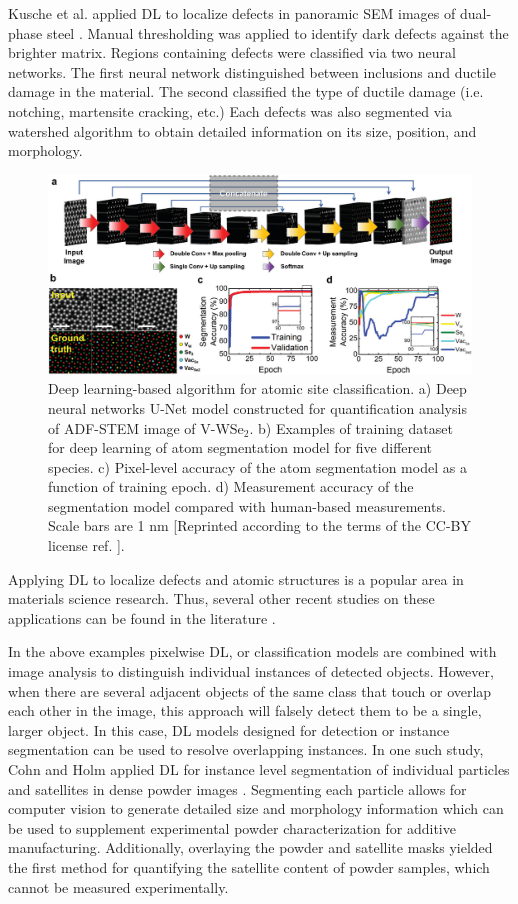 \documentclass[pdflatex,sn-mathphys]{sn-jnl}%
\theoremstyle{thmstyleone}%
\theoremstyle{thmstyletwo}%
\theoremstyle{thmstylethree}%
\begin{document}
Kusche et al. applied DL to localize defects in panoramic SEM images of dual-phase steel \cite{kusche2019large}. Manual thresholding was applied to identify dark defects against the brighter matrix. Regions containing defects were classified via two neural networks. The first neural network distinguished between inclusions and ductile damage in the material. The second classified the type of ductile damage (i.e. notching, martensite cracking, etc.) Each defects was also segmented via watershed algorithm to obtain detailed information on its size, position, and morphology.
\begin{figure}
    \centering
    \includegraphics[width=1.0\textwidth]{Figures/advs2687-fig-0003-m.jpg}
    \caption{Deep learning-based algorithm for atomic site classification. a) Deep neural networks U-Net model constructed for quantification analysis of ADF-STEM image of V-WSe$_2$. b) Examples of training dataset for deep learning of atom segmentation model for five different species. c) Pixel-level accuracy of the atom segmentation model as a function of training epoch. d) Measurement accuracy of the segmentation model compared with human-based measurements. Scale bars are 1 nm [Reprinted according to the terms of the CC-BY license ref. \cite{yang2021deep}].}
\end{figure}

Applying DL to localize defects and atomic structures is a popular area in materials science research. Thus, several other recent studies on these applications can be found in the literature \cite{vlcek2019learning, ziatdinov2017learning, Ovchinnikov2020,LiW2018}.

In the above examples pixelwise DL, or classification models are combined with image analysis to distinguish individual instances of detected objects. However, when there are several adjacent objects of the same class that touch or overlap each other in the image, this approach will falsely detect them to be a single, larger object. In this case, DL models designed for detection or instance segmentation can be used to resolve overlapping instances. In one such study, Cohn and Holm applied DL for instance level segmentation of individual particles and satellites in dense powder images \cite{Cohn2021}.  Segmenting each particle allows for computer vision to generate detailed size and morphology information which can be used to supplement experimental powder characterization for additive manufacturing. Additionally, overlaying the powder and satellite masks yielded the first method for quantifying the satellite content of powder samples, which cannot be measured experimentally.
\end{document}
